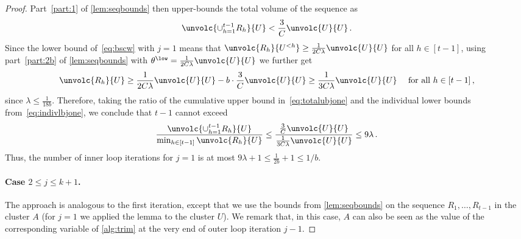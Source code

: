 \begin{proof}
	Part~\eqref{part:1} of \cref{lem:seqbounds} then upper-bounds the total volume of the sequence as
	\begin{equation}
		\label{eq:totalubjone}
		\unvolc{\cup_{h=1}^{t-1} R_h}{U} < \frac{3}{C}\unvolc{U}{U} \, .
	\end{equation}
	Since the lower bound of~\eqref{eq:bscw} with $j=1$ means that $ \unvolc{R_h}{U^{<h}} \ge \frac{1}{2C\lambda}\unvolc{U}{U}$ for all $h \in [t-1]$, using part~\eqref{part:2b} of \cref{lem:seqbounds} with $\theta^{\low} =\frac{1}{2C\lambda}\unvolc{U}{U}$ we further get
		\begin{equation}
		\label{eq:indivlbjone}
		\unvolc{R_h}{U} \ge \frac{1}{2C\lambda}\unvolc{U}{U} - b\cdot \frac{3}{C}\unvolc{U}{U}  \ge  \frac{1}{3C\lambda}\unvolc{U}{U} \quad \text{ for all $h \in [t-1]$}\, ,
	\end{equation}
since  $\lambda \le \frac{1}{18b}$.
	Therefore, taking the ratio of the cumulative upper bound in~\eqref{eq:totalubjone} and the individual lower bounds from~\eqref{eq:indivlbjone}, we conclude that $t-1$ cannot exceed
	\begin{equation*}
		\frac{\unvolc{\cup_{h=1}^{t-1} R_h}{U}}{\min_{h \in [t-1]}\unvolc{R_h}{U}} \le \frac{\frac{3}{C}\unvolc{U}{U}}{\frac{1}{3C\lambda}\unvolc{U}{U}} \le 9 \lambda \, .
	\end{equation*}
Thus, the number of inner loop iterations for $j=1$ is at most $9\lambda +1 \le \frac{1}{2b}+1 \le 1/b$.
	
	\paragraph{Case $2 \le j \le k+1$.} The approach is analogous to the first iteration, except that we use the bounds from \cref{lem:seqbounds} on the sequence $R_1,\dots,R_{t-1}$ in the cluster $A$ (for $j=1$ we applied the lemma to the cluster $U$). We remark that, in this case, $A$ can also be seen as the value of the corresponding variable of \cref{alg:trim} at the very end of outer loop iteration $j-1$.
	

\end{proof}
